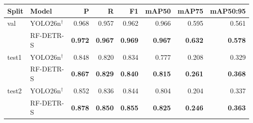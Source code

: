 \begin{tabular}{llrrrrrr}
\toprule
Split & Model & P & R & F1 & mAP50 & mAP75 & mAP50:95 \\
\midrule
val & YOLO26n$^\dagger$ & 0.968 & 0.957 & 0.962 & 0.966 & 0.595 & 0.561 \\
 & RF-DETR-S & \textbf{0.972} & \textbf{0.967} & \textbf{0.969} & \textbf{0.967} & \textbf{0.632} & \textbf{0.578} \\
\midrule
test1 & YOLO26n$^\dagger$ & 0.848 & 0.820 & 0.834 & 0.777 & 0.208 & 0.329 \\
 & RF-DETR-S & \textbf{0.867} & \textbf{0.829} & \textbf{0.840} & \textbf{0.815} & \textbf{0.261} & \textbf{0.368} \\
\midrule
test2 & YOLO26n$^\dagger$ & 0.852 & 0.836 & 0.844 & 0.804 & 0.204 & 0.337 \\
 & RF-DETR-S & \textbf{0.878} & \textbf{0.850} & \textbf{0.855} & \textbf{0.825} & \textbf{0.246} & \textbf{0.363} \\
\bottomrule
\end{tabular}
